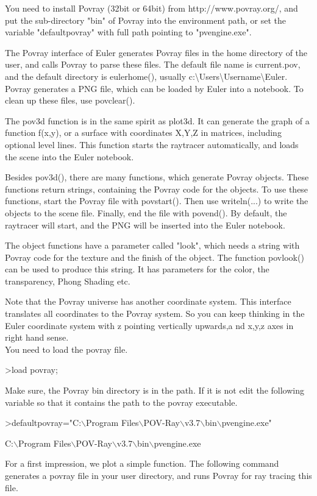 \documentclass[a4paper,10pt]{article}
\begin{document}
\begin{eulernotebook}
\begin{eulercomment}
You need to install Povray (32bit or 64bit) from http://www.povray.org/, and put the sub-directory "bin" of Povray into
the environment path, or set the variable "defaultpovray" with full path pointing to "pvengine.exe".

The Povray interface of Euler generates Povray files in the home directory of the user, and calls Povray to parse these
files. The default file name is current.pov, and the default directory is eulerhome(), usually c:\textbackslash{}Users\textbackslash{}Username\textbackslash{}Euler.
Povray generates a PNG file, which can be loaded by Euler into a notebook. To clean up these files, use povclear().

The pov3d function is in the same spirit as plot3d. It can generate the graph of a function f(x,y), or a surface with
coordinates X,Y,Z in matrices, including optional level lines. This function starts the raytracer automatically, and
loads the scene into the Euler notebook.

Besides pov3d(), there are many functions, which generate Povray objects. These functions return strings, containing the
Povray code for the objects. To use these functions, start the Povray file with povstart(). Then use writeln(...) to
write the objects to the scene file. Finally, end the file with povend(). By default, the raytracer will start, and the
PNG will be inserted into the Euler notebook.

The object functions have a parameter called "look", which needs a string with Povray code for the texture and the finish
of the object. The function povlook() can be used to produce this string. It has parameters for the color, the
transparency, Phong Shading etc.

Note that the Povray universe has another coordinate system. This interface translates all coordinates to the Povray
system. So you can keep thinking in the Euler coordinate system with z pointing vertically upwards,a nd x,y,z axes in
right hand sense.\\
You need to load the povray file.
\end{eulercomment}
\begin{eulerprompt}
>load povray;
\end{eulerprompt}
\begin{eulercomment}
Make sure, the Povray bin directory is in the path. If it is not edit the following variable so that it contains the path
to the povray executable.
\end{eulercomment}
\begin{eulerprompt}
>defaultpovray="C:\(\backslash\)Program Files\(\backslash\)POV-Ray\(\backslash\)v3.7\(\backslash\)bin\(\backslash\)pvengine.exe"
\end{eulerprompt}
\begin{euleroutput}
  C:\(\backslash\)Program Files\(\backslash\)POV-Ray\(\backslash\)v3.7\(\backslash\)bin\(\backslash\)pvengine.exe
\end{euleroutput}
\begin{eulercomment}
For a first impression, we plot a simple function. The following command generates a povray file in your user directory,
and runs Povray for ray tracing this file.


\end{eulercomment}
\end{eulernotebook}
\end{document}
